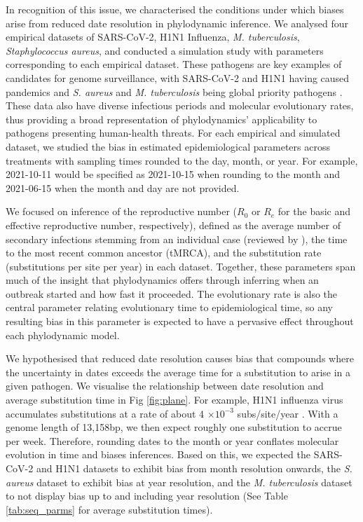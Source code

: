 \documentclass[12pt]{article}
\begin{document}
\begin{spacing}{2}
In recognition of this issue, we characterised the conditions under which biases arise from reduced date resolution in phylodynamic inference. We analysed four empirical datasets of SARS-CoV-2, H1N1 Influenza, \textit{M. tuberculosis}, \textit{Staphylococcus aureus}, and conducted a simulation study with parameters corresponding to each empirical dataset. These pathogens are key examples of candidates for genome surveillance, with SARS-CoV-2 and H1N1 having caused pandemics and \textit{S. aureus} and \textit{M. tuberculosis} being global priority pathogens \citep{who_bppl_2024}. These data also have diverse infectious periods and molecular evolutionary rates, thus providing a broad representation of phylodynamics' applicability to pathogens presenting human-health threats. For each empirical and simulated dataset, we studied the bias in estimated epidemiological parameters across treatments with sampling times rounded to the day, month, or year. For example, 2021-10-11 would be specified as 2021-10-15 when rounding to the month and 2021-06-15 when the month and day are not provided.

We focused on inference of the reproductive number ($R_0$ or $R_e$ for the basic and effective reproductive number, respectively), defined as the average number of secondary infections stemming from an individual case (reviewed by \citet{du2015getting,featherstone2022epidemiological, kuhnert2011phylogenetic}), the time to the most recent common ancestor (tMRCA), and the substitution rate (substitutions per site per year) in each dataset. Together, these parameters span much of the insight that phylodynamics offers through inferring when an outbreak started and how fast it proceeded. The evolutionary rate is also the central parameter relating evolutionary time to epidemiological time, so any resulting bias in this parameter is expected to have a pervasive effect throughout each phylodynamic model.

 We hypothesised that reduced date resolution causes bias that compounds where the uncertainty in dates exceeds the average time for a substitution to arise in a given pathogen. We visualise the relationship between date resolution and average substitution time in Fig \ref{fig:plane}. For example, H1N1 influenza virus accumulates substitutions at a rate of about 4 $\times10^{-3}$ subs/site/year \citep{hedge_2013_real-time}. With a genome length of 13,158bp, we then expect roughly one substitution to accrue per week. Therefore, rounding dates to the month or year conflates molecular evolution in time and biases inferences. Based on this, we expected the SARS-CoV-2 and H1N1 datasets to exhibit bias from month resolution onwards, the \textit{S. aureus} dataset to exhibit bias at year resolution, and the \textit{M. tuberculosis} dataset to not display bias up to and including year resolution (See Table \ref{tab:seq_parms} for average substitution times).
 

\end{spacing}
\end{document}
